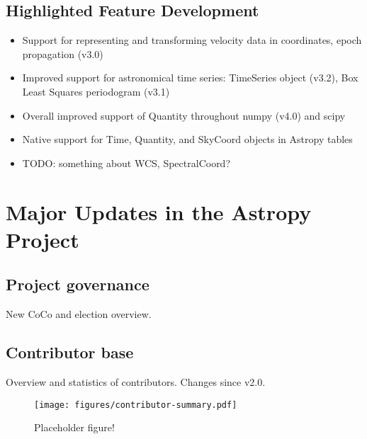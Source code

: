 \documentclass[modern]{aastex631}
\begin{document}
\subsection{Highlighted Feature Development} \label{sec:core-features}

\begin{itemize}
    \item Support for representing and transforming velocity data in coordinates, epoch propagation (v3.0)
    \item Improved support for astronomical time series: TimeSeries object (v3.2), Box Least Squares periodogram (v3.1)
    \item Overall improved support of Quantity throughout numpy (v4.0) and scipy
    \item Native support for Time, Quantity, and SkyCoord objects in Astropy tables
    \item TODO: something about WCS, SpectralCoord?
\end{itemize}


\section{Major Updates in the Astropy Project} \label{sec:project-updates}


\subsection{Project governance} \label{sec:project-governance}

New CoCo and election overview.


\subsection{Contributor base} \label{sec:project-contributors}

Overview and statistics of contributors. Changes since v2.0.

\begin{figure}
    \begin{centering}
        \texttt{[image: figures/contributor-summary.pdf]}
        \caption{Placeholder figure!}
        \label{fig:contributor-summary}
    \end{centering}
\end{figure}

\end{document}
